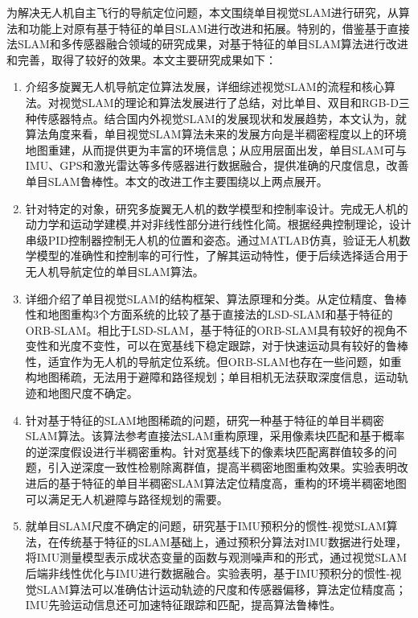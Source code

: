 


\begin{conclusion}
为解决无人机自主飞行的导航定位问题，本文围绕单目视觉SLAM进行研究，从算法和功能上对原有基于特征的单目SLAM进行改进和拓展。特别的，借鉴基于直接法SLAM和多传感器融合领域的研究成果，对基于特征的单目SLAM算法进行改进和完善，取得了较好的效果。本文主要研究成果如下：
\begin{enumerate}  [label={(\arabic*)}]
\item 介绍多旋翼无人机导航定位算法发展，详细综述视觉SLAM的流程和核心算法。对视觉SLAM的理论和算法发展进行了总结，对比单目、双目和RGB-D三种传感器特点。结合国内外视觉SLAM的发展现状和发展趋势，本文认为，就算法角度来看，单目视觉SLAM算法未来的发展方向是半稠密程度以上的环境地图重建，从而提供更为丰富的环境信息；从应用层面出发，单目SLAM可与IMU、GPS和激光雷达等多传感器进行数据融合，提供准确的尺度信息，改善单目SLAM鲁棒性。本文的改进工作主要围绕以上两点展开。
\item 针对特定的对象，研究多旋翼无人机的数学模型和控制率设计。完成无人机的动力学和运动学建模,并对非线性部分进行线性化简。根据经典控制理论，设计串级PID控制器控制无人机的位置和姿态。通过MATLAB仿真，验证无人机数学模型的准确性和控制率的可行性，了解其运动特性，便于后续选择适合用于无人机导航定位的单目SLAM算法。
\item 详细介绍了单目视觉SLAM的结构框架、算法原理和分类。从定位精度、鲁棒性和地图重构3个方面系统的比较了基于直接法的LSD-SLAM和基于特征的ORB-SLAM。相比于LSD-SLAM，基于特征的ORB-SLAM具有较好的视角不变性和光度不变性，可以在宽基线下稳定跟踪，对于快速运动具有较好的鲁棒性，适宜作为无人机的导航定位系统。但ORB-SLAM也存在一些问题，如重构地图稀疏，无法用于避障和路径规划；单目相机无法获取深度信息，运动轨迹和地图尺度不确定。
\item 针对基于特征的SLAM地图稀疏的问题，研究一种基于特征的单目半稠密SLAM算法。该算法参考直接法SLAM重构原理，采用像素块匹配和基于概率的逆深度假设进行半稠密重构。针对宽基线下的像素块匹配离群值较多的问题，引入逆深度一致性检剔除离群值，提高半稠密地图重构效果。实验表明改进后的基于特征的单目半稠密SLAM算法定位精度高，重构的环境半稠密地图可以满足无人机避障与路径规划的需要。
\item 就单目SLAM尺度不确定的问题，研究基于IMU预积分的惯性-视觉SLAM算法，在传统基于特征的SLAM基础上，通过预积分算法对IMU数据进行处理，将IMU测量模型表示成状态变量的函数与观测噪声和的形式，通过视觉SLAM后端非线性优化与IMU进行数据融合。实验表明，基于IMU预积分的惯性-视觉SLAM算法可以准确估计运动轨迹的尺度和传感器偏移，算法定位精度高；IMU先验运动信息还可加速特征跟踪和匹配，提高算法鲁棒性。
\end{enumerate}


\end{conclusion}
